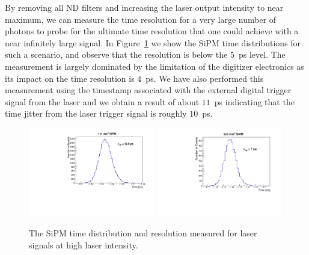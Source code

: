 By removing all ND filters and increasing the laser output intensity to near 
maximum, we can measure the time resolution for a very large number of photons 
to probe for the ultimate time resolution that one could achieve with a near 
infinitely large signal. In Figure~\ref{fig:LargeLightTimeResolution} we show 
the SiPM time distributions for such a scenario, and observe that the resolution 
is below the $5$~ps level. The measurement is largely dominated by the limitation
of the digitizer electronics as its impact on the time resolution is $4$~ps. We 
have also performed this measurement using the timestamp associated with the 
external digital trigger signal from the laser and we obtain a result of about 
$11$~ps indicating that the time jitter from the laser trigger signal is roughly 
$10$~ps. 

\begin{figure}[htbp] 
\centering
\includegraphics[width=0.49\textwidth]{figures/DeltaT_LargeNPhotons_1x1SiPM.pdf} 
\includegraphics[width=0.49\textwidth]{figures/DeltaT_LargeNPhotons_3x3SiPM.pdf} 
\caption{The SiPM time distribution and resolution measured for laser signals at high laser intensity.} 
\label{fig:LargeLightTimeResolution} 
\end{figure} 

